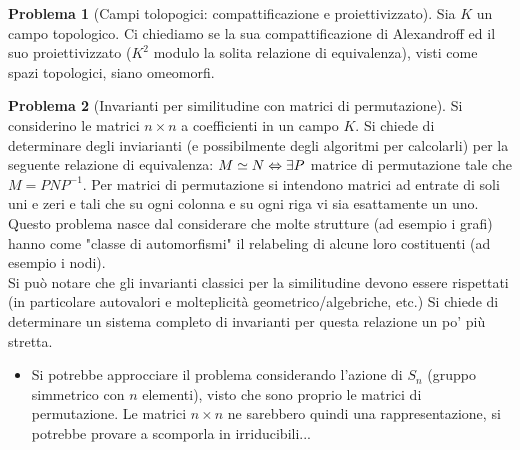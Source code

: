 \documentclass[a4paper,NoNotes,GeneralMath]{stdmdoc}
\theoremstyle{definition}
\newtheorem{problema}{Problema}
\begin{document}
	\begin{problema}[Campi tolopogici: compattificazione e proiettivizzato]
		Sia $K$ un campo topologico. Ci chiediamo se la sua compattificazione di Alexandroff ed il suo proiettivizzato ($K^2$ modulo la solita relazione di equivalenza), visti come spazi topologici, siano omeomorfi.
	\end{problema}
	
	\begin{problema}[Invarianti per similitudine con matrici di permutazione]
		Si considerino le matrici $n \times n$ a coefficienti in un campo $K$. Si chiede di determinare degli inviarianti (e possibilmente degli algoritmi per calcolarli) per la seguente relazione di equivalenza: $ M \simeq N \Leftrightarrow \exists P $ matrice di permutazione tale che $M = P N P^{-1}$. Per matrici di permutazione si intendono matrici ad entrate di soli uni e zeri e tali che su ogni colonna e su ogni riga vi sia esattamente un uno. \\
		Questo problema nasce dal considerare che molte strutture (ad esempio i grafi) hanno come "classe di automorfismi" il relabeling di alcune loro costituenti (ad esempio i nodi). \\
		Si può notare che gli invarianti classici per la similitudine devono essere rispettati (in particolare autovalori e molteplicità geometrico/algebriche, etc.) Si chiede di determinare un sistema completo di invarianti per questa relazione un po' più stretta. \\
		\begin{itemize}
			\item Si potrebbe approcciare il problema considerando l'azione di $S_n$ (gruppo simmetrico con $n$ elementi), visto che sono proprio le matrici di permutazione. Le matrici $n \times n$ ne sarebbero quindi una rappresentazione, si potrebbe provare a scomporla in irriducibili...
		\end{itemize}
	\end{problema}
\end{document}
